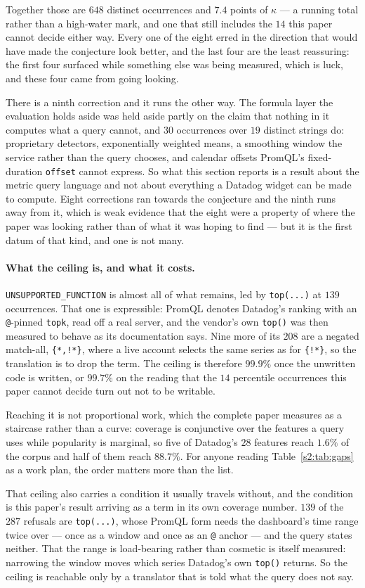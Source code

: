Together those are $648$ distinct occurrences and $7.4$ points of $\kappa$ --- a running
total rather than a high-water mark, and one that still includes the $14$ this paper
cannot decide either way. Every one of the
eight erred in the direction that would have made the conjecture look better, and the last four
are the least reassuring: the first four surfaced while something else was being measured,
which is luck, and these four came from going looking.

There is a ninth correction and it runs the other way. The formula layer the evaluation
holds aside was held aside partly on the claim that nothing in it computes what a query
cannot, and $30$ occurrences over $19$ distinct strings do: proprietary detectors,
exponentially weighted means, a smoothing window the service rather than the query
chooses, and calendar offsets PromQL's fixed-duration \texttt{offset} cannot express. So
what this section reports is a result about the metric query language and not about
everything a Datadog widget can be made to compute. Eight corrections ran towards the
conjecture and the ninth runs away from it, which is weak evidence that the eight were a
property of where the paper was looking rather than of what it was hoping to find --- but
it is the first datum of that kind, and one is not many.

\paragraph{What the ceiling is, and what it costs.}
\texttt{UNSUPPORTED\_FUNCTION} is almost all of what remains, led by \texttt{top(...)} at
$139$ occurrences. That one is expressible: PromQL denotes Datadog's ranking with an
\texttt{@}-pinned \texttt{topk}, read off a real server, and the vendor's own
\texttt{top()} was then measured to behave as its documentation says. Nine more of its
$208$ are a negated match-all, \texttt{\{*,!*\}}, where a live account selects the same
series as for \texttt{\{!*\}}, so the translation is to drop the term. The ceiling is
therefore $99.9\%$ once the unwritten code is written, or $99.7\%$ on the reading that the
$14$ percentile occurrences this paper cannot decide turn out not to be writable.

Reaching it is not proportional work, which the complete paper measures as a staircase
rather than a curve: coverage is conjunctive over the features a query uses while
popularity is marginal, so five of Datadog's $28$ features reach $1.6\%$ of the corpus and
half of them reach $88.7\%$. For anyone reading Table~\ref{s2:tab:gaps} as a work plan, the
order matters more than the list.

That ceiling also carries a condition it usually travels without, and the condition is this
paper's result arriving as a term in its own coverage number. $139$ of the $287$ refusals
are \texttt{top(...)}, whose PromQL form needs the dashboard's time range twice over ---
once as a window and once as an \texttt{@} anchor --- and the query states neither. That the
range is load-bearing rather than cosmetic is itself measured: narrowing the window moves
which series Datadog's own \texttt{top()} returns. So the ceiling is reachable only by a
translator that is told what the query does not say.
